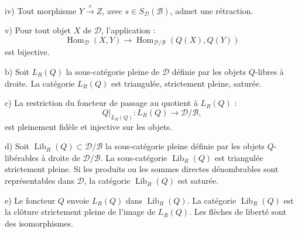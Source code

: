 \par\noindent\hspace{1.2em}iv) Tout morphisme
$Y\xrightarrow{s}Z$, avec $s\in S_{\mathcal D}(\mathcal B)$, admet une
rétraction.

\par\noindent\hspace{1.2em}v) Pour tout objet $X$ de $\mathcal D$,
l'application :
\[
  \operatorname{Hom}_{\mathcal D}(X,Y)\longrightarrow
  \operatorname{Hom}_{\mathcal D/\mathcal B}(Q(X),Q(Y))
\]
est bijective.

\par\noindent b) Soit $L_R(Q)$ la sous-catégorie pleine de $\mathcal D$
définie par les objets $Q$-libres à droite. La catégorie $L_R(Q)$ est
triangulée, strictement pleine, saturée.

\par\noindent c) La restriction du foncteur de passage au quotient à
$L_R(Q)$ :
\[
  Q|_{L_R(Q)}\colon L_R(Q)\longrightarrow\mathcal D/\mathcal B
  ,
\]
est pleinement fidèle et injective sur les objets.

\par\noindent d) Soit $\operatorname{Lib}_R(Q)\subset\mathcal D/\mathcal B$
la sous-catégorie pleine définie par les objets $Q$-libérables à droite de
$\mathcal D/\mathcal B$. La sous-catégorie $\operatorname{Lib}_R(Q)$ est
triangulée strictement pleine. Si les produits ou les sommes directes
dénombrables sont représentables dans $\mathcal D$, la catégorie
$\operatorname{Lib}_R(Q)$ est saturée.

\par\noindent e) Le foncteur $Q$ envoie $L_R(Q)$ dans
$\operatorname{Lib}_R(Q)$. La catégorie $\operatorname{Lib}_R(Q)$ est la
clôture strictement pleine de l'image de $L_R(Q)$. Les flèches de liberté
sont des isomorphismes.
\endgroup
\endgroup
